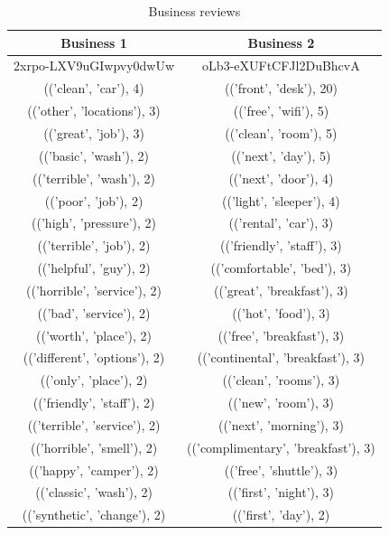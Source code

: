 	\begin{center}
	\tiny
	\begin{table}[!h]
		\caption{Business reviews}
		\begin{tabular}{c | c}
			\textbf{Business 1}			&\textbf{Business 2}\\ \hline
			2xrpo-LXV9uGIwpvy0dwUw		&oLb3-eXUFtCFJl2DuBhcvA\\\hline
			(('clean', 'car'), 4)		&(('front', 'desk'), 20)\\
			(('other', 'locations'), 3)		&(('free', 'wifi'), 5)\\
			(('great', 'job'), 3)		&(('clean', 'room'), 5)\\
			(('basic', 'wash'), 2)		&(('next', 'day'), 5)\\
			(('terrible', 'wash'), 2)		&(('next', 'door'), 4)\\
			(('poor', 'job'), 2)		&(('light', 'sleeper'), 4)\\
			(('high', 'pressure'), 2)		&(('rental', 'car'), 3)\\
			(('terrible', 'job'), 2)		&(('friendly', 'staff'), 3)\\
			(('helpful', 'guy'), 2)		&(('comfortable', 'bed'), 3)\\
			(('horrible', 'service'), 2)		&(('great', 'breakfast'), 3)\\
			(('bad', 'service'), 2)		&(('hot', 'food'), 3)\\
			(('worth', 'place'), 2)		&(('free', 'breakfast'), 3)\\
			(('different', 'options'), 2)		&(('continental', 'breakfast'), 3)\\
			(('only', 'place'), 2)		&(('clean', 'rooms'), 3)\\
			(('friendly', 'staff'), 2)		&(('new', 'room'), 3)\\
			(('terrible', 'service'), 2)		&(('next', 'morning'), 3)\\
			(('horrible', 'smell'), 2)		&(('complimentary', 'breakfast'), 3)\\
			(('happy', 'camper'), 2)		&(('free', 'shuttle'), 3)\\
			(('classic', 'wash'), 2)		&(('first', 'night'), 3)\\
			(('synthetic', 'change'), 2)		&(('first', 'day'), 2)\\
		\end{tabular}
	\end{table}
\end{center}
